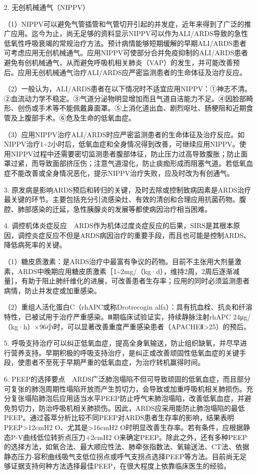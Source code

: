 2. 无创机械通气（NIPPV）

（1）NIPPV可以避免气管插管和气管切开引起的并发症，近年来得到了广泛的推广应用。迄今为止，尚无足够的资料显示NIPPV可以作为ALI/ARDS导致的急性低氧性呼吸衰竭的常规治疗方法。预计病情能够短期缓解的早期ALI/ARDS患者可考虑应用无创机械通气。应用NIPPV可使部分合并免疫抑制的ALI/ARDS患者避免有创机械通气，从而避免呼吸机相关肺炎（VAP）的发生，并可能改善预后。应用无创机械通气治疗ALI/ARDS应严密监测患者的生命体征及治疗反应。

（2）一般认为，ALI/ARDS患者在以下情况时不适宜应用NIPPV：①神志不清。②血流动力学不稳定。③气道分泌物明显增加而且气道自洁能力不足。④因脸部畸形、创伤或手术等不能佩戴鼻面罩。⑤上消化道出血、剧烈呕吐、肠梗阻和近期食管及上腹部手术。⑥危及生命的低氧血症。

（3）应用NIPPV治疗ALI/ARDS时应严密监测患者的生命体征及治疗反应。如NIPPV治疗1\textasciitilde{}2小时后，低氧血症和全身情况得到改善，可继续应用NIPPV。使用NIPPV过程中还需要密切监测患者腹部体征，防止压力过高导致腹胀；防止面罩过紧，而导致面部挤压伤；注意气道湿化，防止痰痂形成而阻塞气道。若低氧血症不能改善或全身情况恶化，提示NIPPV治疗失败，应及时改为有创通气。

3.
原发病是影响ARDS预后和转归的关键，及时去除或控制致病因素是ARDS治疗最关键的环节。主要包括充分引流感染灶、有效的清创和合理应用抗菌药物。腹腔、肺部感染的迁延，急性胰腺炎的发展等都使病因治疗相当困难。

4.
调控机体炎症反应　ARDS作为机体过度炎症反应的后果，SIRS是其根本原因，调控炎症反应不但是ARDS病因治疗的重要手段，而且也可能是控制ARDS、降低病死率的关键。

（1）糖皮质激素：是ARDS治疗中最富有争议的药物。目前不主张用大剂量激素，ARDS中晚期应用糖皮质激素［1\textasciitilde{}2mg/（kg·d），维持2周，2周后逐渐减量］，有助于阻止肺纤维化的进展，可改善患者生存率；应用的同时必须监测患者病情，防止并发症或加重感染。

（2）重组人活化蛋白C（rhAPC或称Drotrecogin
alfa）：具有抗血栓、抗炎和纤溶特性，已被试用于治疗严重感染。Ⅲ期临床试验证实，持续静脉注射rhAPC
24μg/（kg·h）×96小时，可以显著改善重度严重感染患者（APACHEⅡ\textgreater{}25）的预后。

5.
呼吸支持治疗可以纠正低氧血症，提高全身氧输送，防止组织缺氧，并尽早进行营养支持。早期积极的呼吸支持治疗，是纠正或改善顽固性低氧血症的关键手段，使患者不至死于早期严重的低氧血症，为治疗转机赢得时间。

6.
PEEP的选择要点　ARDS广泛肺泡塌陷不但可导致顽固的低氧血症，而且部分可复张的肺泡周期性塌陷开放而产生剪切力，会导致或加重呼吸机相关肺损伤。充分复张塌陷肺泡后应用适当水平PEEP防止呼气末肺泡塌陷，改善低氧血症，并避免剪切力，防治呼吸机相关肺损伤。因此，ARDS应采用能防止肺泡塌陷的最低PEEP。通过荟萃分析比较不同PEEP对ARDS患者生存率的影响，结果表明PEEP\textgreater{}12cmH{2}
O、尤其是\textgreater{}16cmH{2}
O时明显改善生存率。若有条件，应根据静态P-V曲线低位转折点压力+2cmH{2}
O来确定PEEP。除此之外，还有多种PEEP的选择方法，如氧合法、最大顺应性法、肺牵张指数法、氧输送法、CT法、依据静态压力-容积曲线吸气支低位拐点或呼气支拐点选择PEEP等方法。目前尚无足够证据支持何种方法选择最佳PEEP，在很大程度上依靠临床医生的经验。


